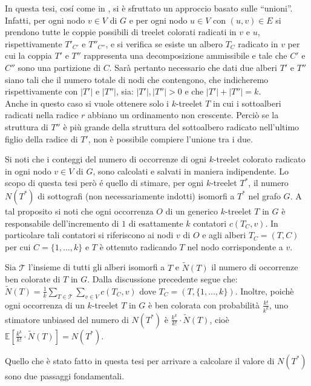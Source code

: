 In questa tesi, cos\'i come in \cite{bressan2019motivo}, si \`e sfruttato un approccio basato sulle ``unioni''. Infatti, per ogni nodo $ v \in V $ di $ G $ e per ogni nodo $ u \in V$ con $ (u,v)\in E $ si prendono tutte le coppie possibili di treelet colorati radicati  in $ v $ e $ u $, rispettivamente $ T'_{C'} $ e $ T''_{C''} $, e si verifica se esiste un albero $T_C$ radicato in $v$ per cui la coppia  $ T'$ e $ T''$ rappresenta una decomposizione ammissibile e tale che $C'$ e $C''$ sono una partizione di $C$.
Sar\`a pertanto necessario che dati due alberi $ T' $ e $ T'' $ siano tali che il numero totale di nodi che contengono, che indicheremo rispettivamente con $ |T'| $ e $ |T''| $, sia: $ |T'|,|T''|>0 $ e che $ |T'| + |T''| = k $.\\
Anche in questo caso si vuole ottenere solo i $ k $-treelet $ T $ in cui i sottoalberi radicati nella radice $ r $ abbiano un ordinamento non crescente.
Perci\`o se la struttura di $ T'' $ è più grande della struttura del sottoalbero radicato nell'ultimo figlio della radice di $ T' $, non \`e possibile compiere l'unione tra i due.

Si noti che i conteggi del numero di occorrenze di ogni $ k $-treelet colorato radicato in ogni nodo $ v\in V $ di $ G $, sono calcolati e salvati in maniera indipendente.
Lo scopo di questa tesi per\`o \'e quello di stimare, per ogni $k$-treelet $T^*$, il numero $N(T^*)$ di  sottografi (non necessariamente indotti) isomorfi a $T^*$ nel grafo $ G $.
A tal proposito si noti che ogni occorrenza $O$ di un generico $k$-treelet $T$ in $G$ è responsabile dell'incremento di $1$ di esattamente $k$ contatori $c(T_C, v)$. In particolare tali contatori si riferiscono ai nodi $v$ di $O$ e agli alberi $T_C = (T,C)$ per cui $C = \{1, \dots, k\} $ e $T$ è ottenuto radicando $T$ nel nodo corrispondente a $v$.

Sia $\mathcal{T}$ l'insieme di tutti gli alberi isomorfi a $T$ e $\widetilde{N}(T)$ il numero di occorrenze ben colorate di $T$ in $G$. Dalla discussione precedente segue che:
$\widetilde{N}(T) = \frac{1}{k}\sum_{T \in \mathcal{T}} \sum_{v \in V} c( T_C, v)$ dove $T_C = (T, \{1,\dots, k\})$. 
Inoltre, poich\`e ogni occorrenza di un $k$-treelet $T$ in $G$ è ben colorata con probabilità $\frac{k!}{k^k}$, uno stimatore unbiased del numero di $N(T^*)$ è $\frac{k^k}{k!} \cdot \widetilde{N}(T)$, cioè
$\mathbb{E}\left[\frac{k^k}{k!} \cdot \widetilde{N}(T)\right] = N(T^*)$.



Quello che è stato fatto in questa tesi per arrivare a calcolare il valore di $ N(T^*) $ sono due passaggi fondamentali.

